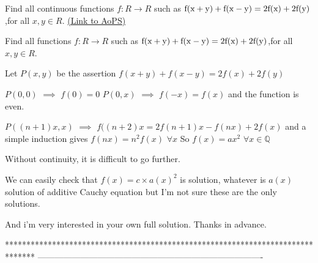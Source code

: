 \begin{problem}
	Find all continuous functions $f:R \to R$ such as ${\rm{f (x  +  y)  +  f (x  -  y)  =  2f (x)  +  2f (y) }}$,for all $x,y\in R$.
	\flushright \href{https://artofproblemsolving.com/community/c6h565465}{(Link to AoPS)}
\end{problem}



\begin{solution}
	\begin{tcolorbox}Find all functions $f:R \to R$ such as ${\rm{f (x  +  y)  +  f (x  -  y)  =  2f (x)  +  2f (y) }}$,for all $x,y\in R$.\end{tcolorbox}
Let $P(x,y)$ be the assertion $f(x+y)+f(x-y)=2f(x)+2f(y)$

$P(0,0)$ $\implies$ $f(0)=0$
$P(0,x)$ $\implies$ $f(-x)=f(x)$ and the function is even.

$P((n+1)x,x)$ $\implies$ $f((n+2)x=2f(n+1)x-f(nx)+2f(x)$ and a simple induction gives $f(nx)=n^2f(x)$ $\forall x$
So $f(x)=ax^2$ $\forall x\in\mathbb Q$

Without continuity, it is difficult to go further.

We can easily check that $f(x)=c\times a(x)^2$ is solution, whatever is $a(x)$ solution of additive Cauchy equation but I'm not sure these are the only solutions.

And i'm very interested in your own full solution. Thanks in advance.
\end{solution}



*******************************************************************************
-------------------------------------------------------------------------------

